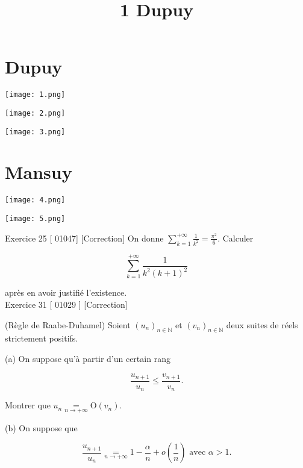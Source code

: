 \documentclass[11pt,a4paper]{article}
\begin{document}
\section{Dupuy}

\begin{figure*}[!h]
	\texttt{[image: 1.png]}
\end{figure*}

\begin{figure*}[!h]
	\texttt{[image: 2.png]}
\end{figure*}

\begin{figure*}[!h]
	\texttt{[image: 3.png]}
\end{figure*}


\newpage
\section{Mansuy}

\begin{figure*}[!h]
	\texttt{[image: 4.png]}
\end{figure*}

\begin{figure*}[!h]
	\texttt{[image: 5.png]}
\end{figure*}
\newpage



\title{
	1 Dupuy
}

Exercice 25 [ 01047] [Correction] On donne $\sum_{k=1}^{+\infty} \frac{1}{k^{2}}=\frac{\pi^{2}}{6}$. Calculer

$$
\sum_{k=1}^{+\infty} \frac{1}{k^{2}(k+1)^{2}}
$$

après en avoir justifié l'existence.\\

Exercice 31 [ 01029 ] [Correction]

(Règle de Raabe-Duhamel) Soient $\left(u_{n}\right)_{n \in \mathbb{N}}$ et $\left(v_{n}\right)_{n \in \mathbb{N}}$ deux suites de réels strictement positifs.

(a) On suppose qu'à partir d'un certain rang

$$
\frac{u_{n+1}}{u_{n}} \leq \frac{v_{n+1}}{v_{n}} .
$$

Montrer que $u_{n} \underset{n \rightarrow+\infty}{=} \mathrm{O}\left(v_{n}\right)$.

(b) On suppose que

$$
\dfrac{u_{n+1}}{u_{n}} \underset{n \rightarrow+\infty}{=} 1-\dfrac{\alpha}{n}+o\left(\frac{1}{n}\right) \text { avec } \alpha>1 .
$$
\end{document}

